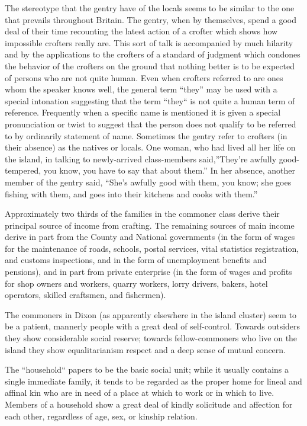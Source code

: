 \documentclass[openany,nobib]{tufte-book}
\begin{document}
The stereotype that the gentry have of the locals seems to be similar to
the one that prevails throughout Britain. The gentry, when by
themselves, spend a good deal of their time recounting the latest action
of a crofter which shows how impossible crofters really are. This sort
of talk is accompanied by much hilarity and by the applications to the
crofters of a standard of judgment which condones the behavior of the
crofters on the ground that nothing better is to be expected of persons
who are not quite human. Even when crofters referred to are ones whom
the speaker knows well, the general term ``they'' may be used with a
special intonation suggesting that the term ``they`` is not quite a
human term of reference. Frequently when a specific name is mentioned it
is given a special pronunciation or twist to suggest that the person
does not qualify to be referred to by ordinarily statement of name.
Sometimes the gentry refer to crofters (in their absence) as the natives
or locals. One woman, who had lived all her life on the island, in
talking to newly-arrived class-members said,''They're awfully
good-tempered, you know, you have to say that about them.'' In her
absence, another member of the gentry said, ``She's awfully good with
them, you know; she goes fishing with them, and goes into their kitchens
and cooks with them.''

Approximately two thirds of the families in the commoner class derive
their principal source of income from crafting. The remaining sources of
main income derive in part from the County and National governments (in
the form of wages for the maintenance of roads, schools, postal
services, vital statistics registration, and customs inspections, and in
the form of unemployment benefits and pensions), and in part from
private enterprise (in the form of wages and profits for shop owners and
workers, quarry workers, lorry drivers, bakers, hotel operators, skilled
craftsmen, and fishermen).

The commoners in Dixon (as apparently elsewhere in the island cluster)
seem to be a patient, mannerly people with a great deal of self-control.
Towards outsiders they show considerable social reserve; towards
fellow-commoners who live on the island they show equalitarianism
respect and a deep sense of mutual concern.

The ``household`` papers to be the basic social unit; while it usually
contains a single immediate family, it tends to be regarded as the
proper home for lineal and affinal kin who are in need of a place at
which to work or in which to live. Members of a household show a great
deal of kindly solicitude and affection for each other, regardless of
age, sex, or kinship relation.
\end{document}
